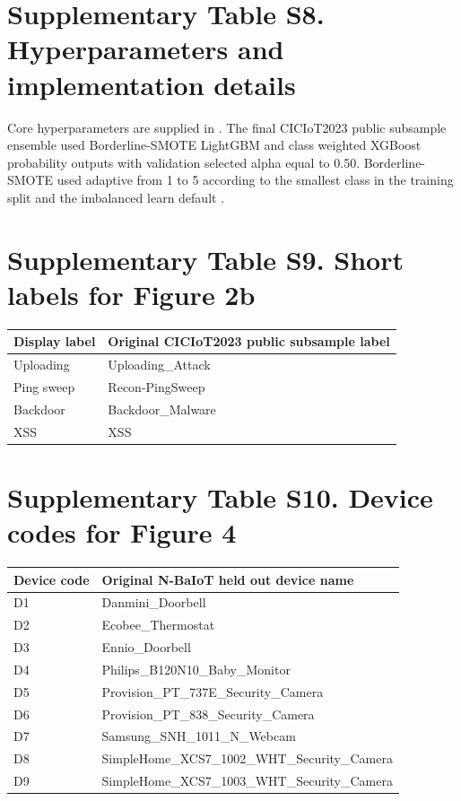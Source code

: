 \documentclass[10pt]{article}
\begin{document}
\section*{Supplementary Table S8. Hyperparameters and implementation details}

Core hyperparameters are supplied in . The final CICIoT2023 public subsample ensemble used Borderline-SMOTE LightGBM and class weighted XGBoost probability outputs with validation selected alpha equal to 0.50. Borderline-SMOTE used adaptive  from 1 to 5 according to the smallest class in the training split and the imbalanced learn default .

\section*{Supplementary Table S9. Short labels for Figure 2b}

\begin{center}
\small
\begin{tabular}{ll}
\toprule
Display label & Original CICIoT2023 public subsample label \\
\midrule
Uploading & Uploading\_Attack \\
Ping sweep & Recon-PingSweep \\
Backdoor & Backdoor\_Malware \\
XSS & XSS \\
\bottomrule
\end{tabular}
\end{center}

\section*{Supplementary Table S10. Device codes for Figure 4}

\begin{center}
\small
\begin{tabular}{ll}
\toprule
Device code & Original N-BaIoT held out device name \\
\midrule
D1 & Danmini\_Doorbell \\
D2 & Ecobee\_Thermostat \\
D3 & Ennio\_Doorbell \\
D4 & Philips\_B120N10\_Baby\_Monitor \\
D5 & Provision\_PT\_737E\_Security\_Camera \\
D6 & Provision\_PT\_838\_Security\_Camera \\
D7 & Samsung\_SNH\_1011\_N\_Webcam \\
D8 & SimpleHome\_XCS7\_1002\_WHT\_Security\_Camera \\
D9 & SimpleHome\_XCS7\_1003\_WHT\_Security\_Camera \\
\bottomrule
\end{tabular}
\end{center}
\end{document}
